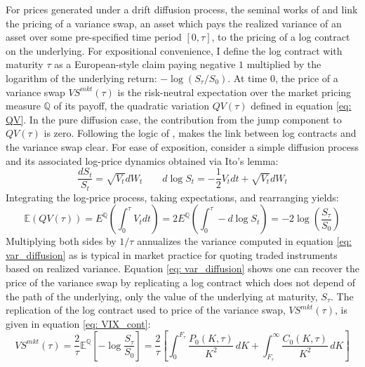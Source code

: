 \documentclass[12pt]{article}
\begin{document}
For prices generated under a drift diffusion process, the seminal works of \cite{dupire1994pricing} and \cite{neuberger1994log} link the pricing of a variance swap, an asset which pays the realized variance of an asset over some pre-specified time period $[0, \tau]$, to the pricing of a log contract on the underlying. For expositional convenience, I define the log contract with maturity $\tau$ as a European-style claim paying negative $1$ multiplied by the logarithm of the underlying return: $-\log(S_\tau/ S_0)$.  At time 0, the price of a variance swap $VS^{mkt}(\tau)$ is the risk-neutral expectation over the market pricing measure $\mathbb{Q}$ of its payoff, the quadratic variation $QV(\tau)$ defined in equation \eqref{eq: QV}. In the pure diffusion case, the contribution from the jump component to $QV(\tau)$ is zero. Following the logic of \cite{britten2000option}, makes the link between log contracts and the variance swap clear. For ease of exposition, consider a simple diffusion process and its associated log-price dynamics obtained via Ito's lemma:
\begin{equation}
   \dfrac{dS_t}{S_t} = \sqrt{V_t} dW_t \qquad d \log S_t=-\frac{1}{2} V_t d t+\sqrt{V_t }d W_t
\end{equation}
Integrating the log-price process, taking expectations, and rearranging yields:
\begin{equation}\label{eq: var_diffusion}
\mathbb{E}\left(QV(\tau)\right) = E^\mathbb{Q}\left(\int_0^\tau V_t d t\right) =  2E^\mathbb{Q}\left(\int_0^\tau -d \log S_t\right) = -2\log\left( \dfrac{S_\tau}{S_0}\right)
\end{equation}
Multiplying both sides by $1/\tau$ annualizes the variance computed in equation \eqref{eq: var_diffusion} as is typical in market practice for quoting traded instruments based on realized variance. Equation \eqref{eq: var_diffusion} shows one can recover the price of the variance swap by replicating a log contract which does not depend of the path of the underlying, only the value of the underlying at maturity, $S_{\tau}$. The replication of the log contract used to price of the variance swap, $VS^{mkt}(\tau)$, is given in equation \eqref{eq: VIX_cont}:
\begin{equation}\label{eq: VIX_cont}
 VS^{mkt}(\tau) =  \dfrac{2}{\tau} \mathbb{E}^\mathbb{Q}\left[-\log\dfrac{S_\tau}{S_0}\right] = \dfrac{2}{\tau}\left[\int_0^{F_\tau} \dfrac{P_0(K,\tau)}{K^2} \, dK + \int_{F_\tau}^\infty \dfrac{C_0(K,\tau)}{K^2}  \, dK \right]
\end{equation}
\end{document}
